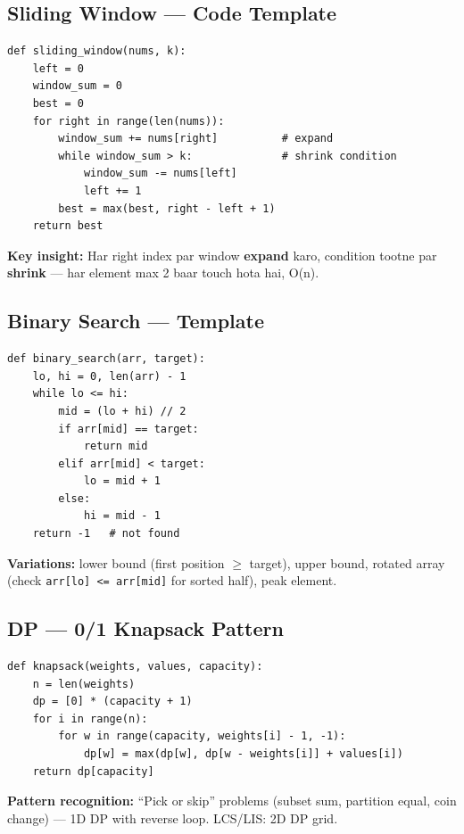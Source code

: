 \subsection{Sliding Window --- Code Template}

\begin{codestorybox}
\begin{lstlisting}[style=pythonstyle, caption={Variable window template}]
def sliding_window(nums, k):
    left = 0
    window_sum = 0
    best = 0
    for right in range(len(nums)):
        window_sum += nums[right]          # expand
        while window_sum > k:              # shrink condition
            window_sum -= nums[left]
            left += 1
        best = max(best, right - left + 1)
    return best
\end{lstlisting}

\textbf{Key insight:} Har right index par window \textbf{expand} karo, condition tootne par \textbf{shrink} --- har element max 2 baar touch hota hai, O(n).
\end{codestorybox}

\subsection{Binary Search --- Template}

\begin{codestorybox}
\begin{lstlisting}[style=pythonstyle, caption={Binary search template}]
def binary_search(arr, target):
    lo, hi = 0, len(arr) - 1
    while lo <= hi:
        mid = (lo + hi) // 2
        if arr[mid] == target:
            return mid
        elif arr[mid] < target:
            lo = mid + 1
        else:
            hi = mid - 1
    return -1   # not found
\end{lstlisting}

\textbf{Variations:} lower bound (first position $\geq$ target), upper bound, rotated array (check \texttt{arr[lo] <= arr[mid]} for sorted half), peak element.
\end{codestorybox}

\subsection{DP --- 0/1 Knapsack Pattern}

\begin{codestorybox}
\begin{lstlisting}[style=pythonstyle, caption={Knapsack DP}]
def knapsack(weights, values, capacity):
    n = len(weights)
    dp = [0] * (capacity + 1)
    for i in range(n):
        for w in range(capacity, weights[i] - 1, -1):
            dp[w] = max(dp[w], dp[w - weights[i]] + values[i])
    return dp[capacity]
\end{lstlisting}

\textbf{Pattern recognition:} ``Pick or skip'' problems (subset sum, partition equal, coin change) --- 1D DP with reverse loop. LCS/LIS: 2D DP grid.
\end{codestorybox}

